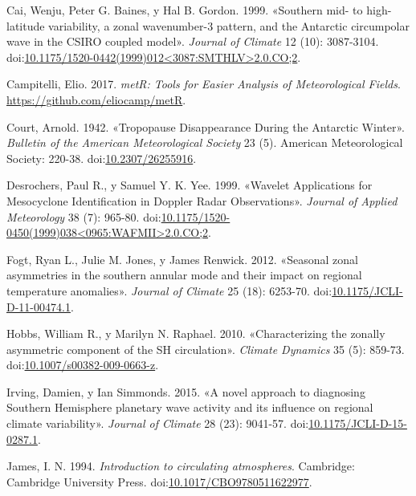 \documentclass[spanish,a4paper,12p]{book}
\begin{document}
\hypertarget{ref-Cai1999}{}
Cai, Wenju, Peter G. Baines, y Hal B. Gordon. 1999. «Southern mid- to
high-latitude variability, a zonal wavenumber-3 pattern, and the
Antarctic circumpolar wave in the CSIRO coupled model». \emph{Journal of
Climate} 12 (10): 3087-3104.
doi:\href{https://doi.org/10.1175/1520-0442(1999)012\%3C3087:SMTHLV\%3E2.0.CO;2}{10.1175/1520-0442(1999)012\textless{}3087:SMTHLV\textgreater{}2.0.CO;2}.

\hypertarget{ref-R-metR}{}
Campitelli, Elio. 2017. \emph{metR: Tools for Easier Analysis of
Meteorological Fields}. \url{https://github.com/eliocamp/metR}.

\hypertarget{ref-Court1942}{}
Court, Arnold. 1942. «Tropopause Disappearance During the Antarctic
Winter». \emph{Bulletin of the American Meteorological Society} 23 (5).
American Meteorological Society: 220-38.
doi:\href{https://doi.org/10.2307/26255916}{10.2307/26255916}.

\hypertarget{ref-Desrochers1999}{}
Desrochers, Paul R., y Samuel Y. K. Yee. 1999. «Wavelet Applications for
Mesocyclone Identification in Doppler Radar Observations». \emph{Journal
of Applied Meteorology} 38 (7): 965-80.
doi:\href{https://doi.org/10.1175/1520-0450(1999)038\%3C0965:WAFMII\%3E2.0.CO;2}{10.1175/1520-0450(1999)038\textless{}0965:WAFMII\textgreater{}2.0.CO;2}.

\hypertarget{ref-Fogt2012}{}
Fogt, Ryan L., Julie M. Jones, y James Renwick. 2012. «Seasonal zonal
asymmetries in the southern annular mode and their impact on regional
temperature anomalies». \emph{Journal of Climate} 25 (18): 6253-70.
doi:\href{https://doi.org/10.1175/JCLI-D-11-00474.1}{10.1175/JCLI-D-11-00474.1}.

\hypertarget{ref-Hobbs2010}{}
Hobbs, William R., y Marilyn N. Raphael. 2010. «Characterizing the
zonally asymmetric component of the SH circulation». \emph{Climate
Dynamics} 35 (5): 859-73.
doi:\href{https://doi.org/10.1007/s00382-009-0663-z}{10.1007/s00382-009-0663-z}.

\hypertarget{ref-Irving2015}{}
Irving, Damien, y Ian Simmonds. 2015. «A novel approach to diagnosing
Southern Hemisphere planetary wave activity and its influence on
regional climate variability». \emph{Journal of Climate} 28 (23):
9041-57.
doi:\href{https://doi.org/10.1175/JCLI-D-15-0287.1}{10.1175/JCLI-D-15-0287.1}.

\hypertarget{ref-James}{}
James, I. N. 1994. \emph{Introduction to circulating atmospheres}.
Cambridge: Cambridge University Press.
doi:\href{https://doi.org/10.1017/CBO9780511622977}{10.1017/CBO9780511622977}.
\end{document}
